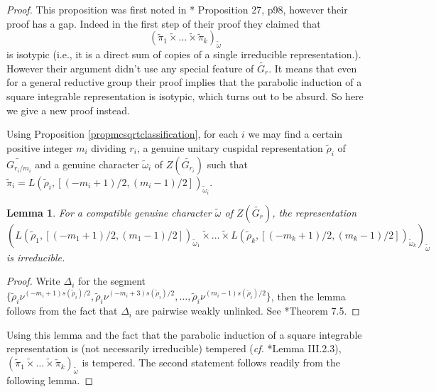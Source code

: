 \documentclass{amsart}
\numberwithin{equation}{section}
\newtheorem{lemma}[theorem]{\bf{Lemma}}
\newcommand{\wt}[1]{\widetilde{#1}}
\begin{document}
	\begin{proof}
		
		This proposition was first noted in \cite{flicker1986metaplectic}*{ Proposition 27, p98}, however their proof has a gap. Indeed in the first step of their proof they claimed that $$(\wt{\pi}_{1}\wt{\times}\dots\wt{\times}\wt{\pi}_{k})_{\wt{\omega}}$$ is isotypic (i.e., it is a direct sum of copies of a single irreducible representation.). However their argument didn't use any special feature of $\wt{G_{r}}$. It means that even for a general reductive group their proof implies that the parabolic induction of a square integrable representation is isotypic, which turns out to be absurd. So here we give a new proof instead.
		
		Using Proposition \ref{propmcsqrtclassification}, for each $i$ we may find a certain positive integer $m_{i}$ dividing $r_{i}$, a genuine unitary cuspidal representation $\wt{\rho}_{i}$ of $\wt{G_{r_{i}/m_{i}}}$ and a genuine character $\wt{\omega}_{i}$ of $Z(\wt{G_{r_{i}}})$ such that
		$\wt{\pi}_{i}=L(\wt{\rho}_{i},[(-m_{i}+1)/2,(m_{i}-1)/2])_{\wt{\omega}_{i}}$. 
		
		\begin{lemma}
			
			For a compatible genuine character  $\wt{\omega}$ of $Z(\wt{G_{r}})$, the representation 
			$$(L(\wt{\rho}_{1},[(-m_{1}+1)/2,(m_{1}-1)/2])_{\wt{\omega}_{1}}\wt{\times}\dots\wt{\times} L(\wt{\rho}_{k},[(-m_{k}+1)/2,(m_{k}-1)/2])_{\wt{\omega}_{k}})_{\wt{\omega}}$$ 
			is irreducible.
			
		\end{lemma}
		
		\begin{proof}
			
			Write $\Delta_{i}$ for the segment $\{\wt{\rho}_{i}\nu^{(-m_{i}+1)s(\wt{\rho}_{i})/2},\wt{\rho}_{i}\nu^{(-m_{i}+3)s(\wt{\rho}_{i})/2},\dots,\wt{\rho}_{i}\nu^{(m_{i}-1)s(\wt{\rho}_{i})/2}\}$, then the lemma follows from the fact that $\Delta_{i}$ are pairwise weakly unlinked. See \cite{kaplan2022classification}*{Theorem 7.5}.
			
		\end{proof}
		
		Using this lemma and the fact that the parabolic induction of a square integrable representation is (not necessarily irreducible) tempered (\emph{cf.} \cite{waldspurger2003formule}*{Lemma III.2.3}), $(\wt{\pi}_{1}\wt{\times}\dots\wt{\times}\wt{\pi}_{k})_{\wt{\omega}}$ is tempered. The second statement follows readily from the following lemma.
		

\end{proof}
\end{document}
